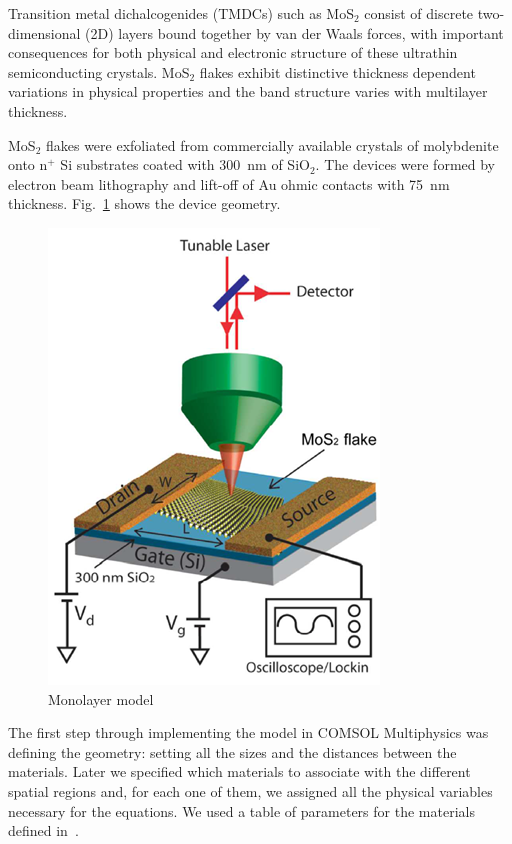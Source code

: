 \documentclass[12pt,a4paper,titlepage]{article}
\begin{document}
Transition metal dichalcogenides (TMDCs) such as MoS$_2$ consist of discrete two-dimensional (2D) layers bound together by van der Waals forces, with important consequences for both physical and electronic structure of these ultrathin semiconducting crystals. MoS$_2$ flakes exhibit distinctive thickness dependent variations in physical properties and the band structure varies with multilayer thickness.

MoS$_2$ flakes were exfoliated from commercially available crystals of molybdenite onto n$^+$ Si substrates coated with \SI{300}{\nano \meter} of SiO$_2$. The devices were formed by electron beam lithography and lift-off of Au ohmic contacts with \SI{75}{\nano \meter} thickness. Fig.~\ref{fig:monolayer_model} shows the device geometry.

\begin{figure}[H]
	\centering
	\includegraphics[width=.5\textwidth]{Immagini/monolayer_model.png} 
	\caption{Monolayer model~\cite{Wu:Ultrathin_MoS2}}
	\label{fig:monolayer_model}
\end{figure} 

The first step through implementing the model in COMSOL Multiphysics was defining the geometry: setting all the sizes and the distances between the materials. Later we specified which materials to associate with the different spatial regions and, for each one of them, we assigned all the physical variables necessary for the equations. We used a table of parameters for the materials defined in~\cite{Howell:MonolayerMultiLayer_MoS2}.
\end{document}
